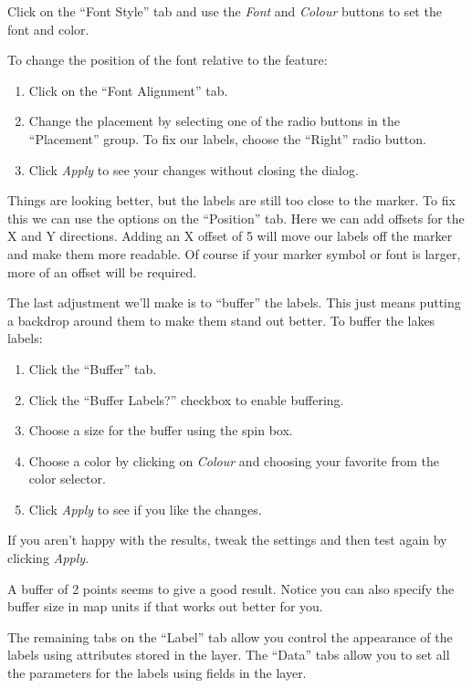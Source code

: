 Click on the ``Font Style'' tab and use the \textsl{Font} and \textsl{Colour}
buttons to set the font and color.

To change the position of the font relative to the feature:

\begin{enumerate} 
\item Click on the ``Font Alignment'' tab.
\item Change the placement by selecting one of the radio buttons
in the ``Placement'' group. To fix our labels, choose the ``Right'' radio
button.
\item Click \textsl{Apply} to see your changes without closing the dialog.
\end{enumerate} 

Things are looking better, but the labels are still too close to the marker. To
fix this we can use the options on the ``Position'' tab. Here we can add
offsets for the X and Y directions. Adding an X offset of 5 will move our
labels off the marker and make them more readable. Of course if your marker
symbol or font is larger, more of an offset will be required.

The last adjustment we'll make is to ``buffer'' the labels. This just means
putting a backdrop around them to make them stand out better. To buffer the
lakes labels:

\begin{enumerate}
\item Click the ``Buffer'' tab.
\item Click the ``Buffer Labels?'' checkbox to enable buffering.
\item Choose a size for the buffer using the spin box.
\item Choose a color by clicking on \textsl{Colour} and choosing your
  favorite from the color selector.
\item Click \textsl{Apply} to see if you like the changes.
\end{enumerate} 

If you aren't happy with the results, tweak the settings and then test again
by clicking \textsl{Apply}.

A buffer of 2 points seems to give a good result.
Notice you can also specify the buffer size in map units if that works out
better for you.

The remaining tabs on the ``Label'' tab allow you control the appearance of the
labels using attributes stored in the layer. The ``Data'' tabs allow you to
set all the parameters for the labels using fields in the layer.

